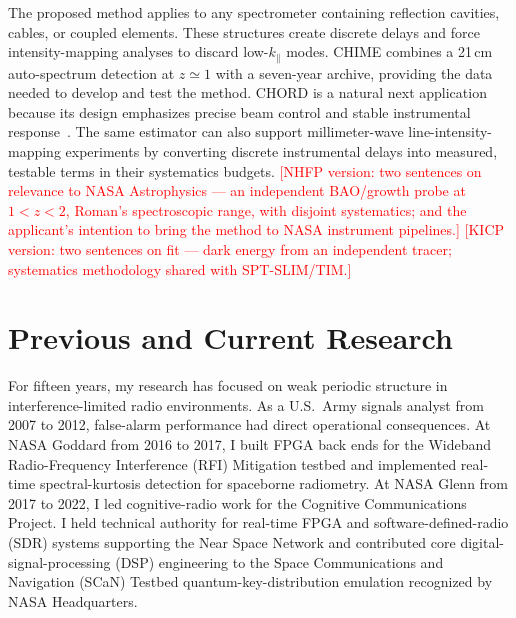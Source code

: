 \documentclass[12pt]{article}
\newcommand{\todo}[1]{\textcolor{red}{[#1]}}
\newcommand{\kpar}{k_\parallel}
\begin{document}
The proposed method applies to any spectrometer containing reflection cavities, cables, or coupled elements. These structures create discrete delays and force intensity-mapping analyses to discard low-$\kpar$ modes. CHIME combines a 21\,cm auto-spectrum detection at $z\simeq1$ with a seven-year archive, providing the data needed to develop and test the method. CHORD is a natural next application because its design emphasizes precise beam control and stable instrumental response~\cite[Abstract, p.~2; Sec.~1, pp.~2--3; Sec.~2.2, p.~4]{chord2026}. The same estimator can also support millimeter-wave line-intensity-mapping experiments by converting discrete instrumental delays into measured, testable terms in their systematics budgets. \todo{NHFP version: two sentences on relevance to NASA Astrophysics --- an independent BAO/growth probe at $1<z<2$, Roman's spectroscopic range, with disjoint systematics; and the applicant's intention to bring the method to NASA instrument pipelines.} \todo{KICP version: two sentences on fit --- dark energy from an independent tracer; systematics methodology shared with SPT-SLIM/TIM.}

\section*{Previous and Current Research}

For fifteen years, my research has focused on weak periodic structure in interference-limited radio environments. As a U.S.\ Army signals analyst from 2007 to 2012, false-alarm performance had direct operational consequences. At NASA Goddard from 2016 to 2017, I built FPGA back ends for the Wideband Radio-Frequency Interference (RFI) Mitigation testbed and implemented real-time spectral-kurtosis detection for spaceborne radiometry. At NASA Glenn from 2017 to 2022, I led cognitive-radio work for the Cognitive Communications Project. I held technical authority for real-time FPGA and software-defined-radio (SDR) systems supporting the Near Space Network and contributed core digital-signal-processing (DSP) engineering to the Space Communications and Navigation (SCaN) Testbed quantum-key-distribution emulation recognized by NASA Headquarters.
\end{document}
